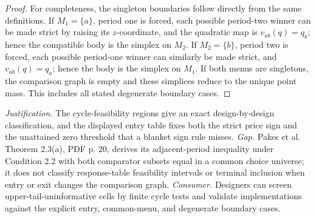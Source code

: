 \documentclass{article}
\begin{document}
\begin{proof}
For completeness, the singleton boundaries follow directly from the same definitions.  If \(M_1=\{a\}\), period one is forced, each possible period-two winner can be made strict by raising its \(z\)-coordinate, and the quadratic map is \(v_{ab}(q)=q_b\); hence the compatible body is the simplex on \(M_2\).  If \(M_2=\{b\}\), period two is forced, each possible period-one winner can similarly be made strict, and \(v_{ab}(q)=q_a\); hence the body is the simplex on \(M_1\).  If both menus are singletons, the comparison graph is empty and these simplices reduce to the unique point mass.  This includes all stated degenerate boundary cases.
\end{proof}
\par\smallskip\noindent \textit{Justification.} The cycle-feasibility regions give an exact design-by-design classification, and the displayed entry table fixes both the strict price sign and the unattained zero threshold that a blanket sign rule misses. \textit{Gap.} Pakes et al. Theorem 2.3(a), PDF p. 20, derives its adjacent-period inequality under Condition 2.2 with both comparator subsets equal in a common choice universe; it does not classify response-table feasibility intervals or terminal inclusion when entry or exit changes the comparison graph. \textit{Consumer.} Designers can screen upper-tail-uninformative cells by finite cycle tests and validate implementations against the explicit entry, common-menu, and degenerate boundary cases.
\end{document}
